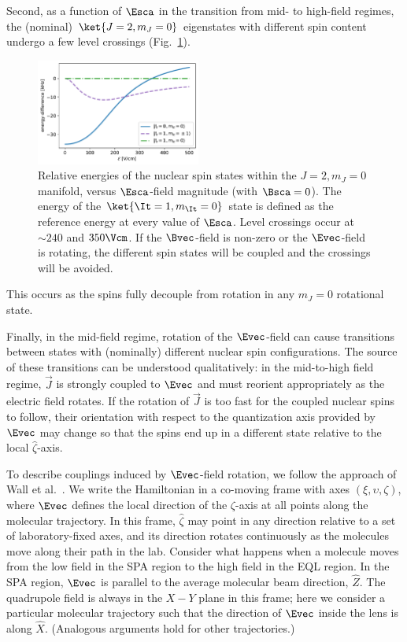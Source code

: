Second, as a function of $\Esca$ in the transition from mid- to high-field regimes, the (nominal) $\ket{J=2,m_J=0}$ eigenstates with different spin content undergo a few level crossings (Fig.~\ref{fig:spin_state_crossings}).
\begin{figure}
	\centering
	\includegraphics[width=0.48\textwidth,unit=1mm]{figs/matplotlib/spin_state_crossings.pdf}

	\caption{Relative energies of the nuclear spin states within the $J=2, m_J = 0$ manifold, versus $\Esca$-field magnitude (with $\Bsca = 0$). The energy of the $\ket{\It=1, m_{\It} = 0}$ state is defined as the reference energy at every value of $\Esca$. Level crossings occur at $\sim240$ and $350 \Vcm$. If the $\Bvec$-field is non-zero or the $\Evec$-field is rotating, the different spin states will be coupled and the crossings will be avoided.}
	\label{fig:spin_state_crossings}
\end{figure}
This occurs as the spins fully decouple from rotation in any $m_J=0$ rotational state.

Finally, in the  mid-field regime, rotation of the $\Evec$-field can cause transitions between states with (nominally) different nuclear spin configurations. The source of these transitions can be understood qualitatively: in the mid-to-high field regime, $ \vec{J} $ is strongly coupled to $\Evec$ and must reorient appropriately as the electric field rotates. If the rotation of $ \vec{J} $ is too fast for the coupled nuclear spins to follow, their orientation with respect to the quantization axis provided by $ \Evec $ may change so that the spins end up in a different state relative to the local $\hat{\zeta}$-axis.

To describe couplings induced by $\Evec$-field rotation, we follow the approach of Wall et al.\ \cite{wall_nonadiabatic_2010}. We write the Hamiltonian in a co-moving frame with axes $(\xi,\upsilon,\zeta)$, where $\Evec$ defines the local direction of the $\zeta$-axis at all points along the molecular trajectory. In this frame, $\hat{\zeta}$ may point in any direction relative to a set of laboratory-fixed axes, and its direction rotates continuously as the molecules move along their path in the lab. Consider what happens when a molecule moves from the low field in the SPA region to the high field in the EQL region. In the SPA region, $\Evec$ is parallel to the average molecular beam direction, $\hat{Z}$. The quadrupole field is always in the $X-Y$ plane in this frame; here we consider a particular molecular trajectory such that the direction of $\Evec$ inside the lens is along $\hat{X}$. (Analogous arguments hold for other trajectories.)

